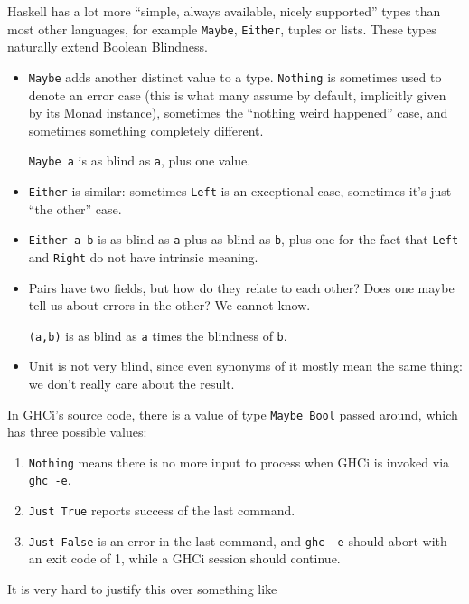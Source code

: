 Haskell has a lot more ``simple, always available, nicely supported'' types than most other languages, for example \texttt{Maybe}, \texttt{Either}, tuples or lists. These types naturally extend Boolean Blindness.

\begin{itemize}
\item \texttt{Maybe} adds another distinct value to a type. \texttt{Nothing} is sometimes used to denote an error case (this is what many assume by default, implicitly given by its Monad instance), sometimes the ``nothing weird happened'' case, and sometimes something completely different.

\texttt{Maybe a} is as blind as \texttt{a}, plus one value.

\item \texttt{Either} is similar: sometimes \texttt{Left} is an exceptional case, sometimes it's just ``the other'' case.

\item \texttt{Either a b} is as blind as \texttt{a} plus as blind as \texttt{b}, plus one for the fact that \texttt{Left} and \texttt{Right} do not have intrinsic meaning.

\item Pairs have two fields, but how do they relate to each other? Does one maybe tell us about errors in the other? We cannot know.

\texttt{(a,b)} is as blind as \texttt{a} times the blindness of \texttt{b}.

\item Unit is not very blind, since even synonyms of it mostly mean the same thing: we don't really care about the result.                                                                                                                    \end{itemize}
In GHCi's source code, there is a value of type \texttt{Maybe Bool} passed around, which has three possible values:

\begin{enumerate}
\item \texttt{Nothing} means there is no more input to process when GHCi is invoked via \texttt{ghc -e}.
\item \texttt{Just True} reports success of the last command.
\item \texttt{Just False} is an error in the last command, and \texttt{ghc -e} should abort with an exit code of 1, while a GHCi session should continue.
\end{enumerate}
It is very hard to justify this over something like

